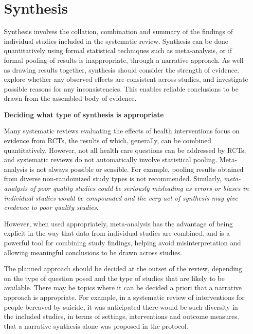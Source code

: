 \documentclass[
  10pt,
  a4paper,
  DIV=11,
  numbers=noendperiod]{scrreprt}
\begin{document}
\section{Synthesis}\label{synthesis-1}

Synthesis involves the collation, combination and summary of the
findings of individual studies included in the systematic review.
Synthesis can be done quantitatively using formal statistical techniques
such as meta-analysis, or if formal pooling of results is inappropriate,
through a narrative approach. As well as drawing results together,
synthesis should consider the strength of evidence, explore whether any
observed effects are consistent across studies, and investigate possible
reasons for any inconsistencies. This enables reliable conclusions to be
drawn from the assembled body of evidence.

\textbf{Deciding what type of synthesis is appropriate}

Many systematic reviews evaluating the effects of health interventions
focus on evidence from RCTs, the results of which, generally, can be
combined quantitatively. However, not all health care questions can be
addressed by RCTs, and systematic reviews do not automatically involve
statistical pooling. Meta-analysis is not always possible or sensible.
For example, pooling results obtained from diverse non-randomized study
types is not recommended. Similarly, \emph{meta-analysis of poor quality
studies could be seriously misleading as errors or biases in individual
studies would be compounded and the very act of synthesis may give
credence to poor quality studies}.

However, when used appropriately, meta-analysis has the advantage of
being explicit in the way that data from individual studies are
combined, and is a powerful tool for combining study findings, helping
avoid misinterpretation and allowing meaningful conclusions to be drawn
across studies.

The planned approach should be decided at the outset of the review,
depending on the type of question posed and the type of studies that are
likely to be available. There may be topics where it can be decided a
priori that a narrative approach is appropriate. For example, in a
systematic review of interventions for people bereaved by suicide, it
was anticipated there would be such diversity in the included studies,
in terms of settings, interventions and outcome measures, that a
narrative synthesis alone was proposed in the protocol.
\end{document}
